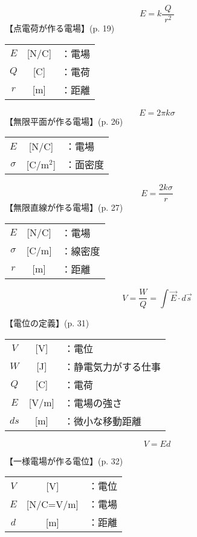 \documentclass[10pt]{jarticle}
\begin{document}
\newpage
\[
E = k \frac{Q}{\; r^2 \;}
\]
\vskip3mm
【点電荷が作る電場】{\footnotesize (p. 19)}

\begin{tabular}{ccl}
$E$	&[N/C]	&：電場 \\
$Q$	&[C]	&：電荷 \\
$r$	&[m]	&：距離
\end{tabular}





\newpage
\[
E = 2 \pi k \sigma
\]
\vskip3mm
【無限平面が作る電場】{\footnotesize (p. 26)}

\begin{tabular}{ccl}
$E$	&[N/C]	&：電場 \\
$\sigma$	&[C/m$^2$]	&：面密度
\end{tabular}




\newpage
\[
E = \frac{2k \sigma}{r}
\]
\vskip3mm
【無限直線が作る電場】{\footnotesize (p. 27)}

\begin{tabular}{ccl}
$E$	&[N/C]	&：電場 \\
$\sigma$	&[C/m]	&：線密度\\
$r$	&[m]	&：距離
\end{tabular}




\newpage
\[
V = \frac{W}{Q} = \int \vec{E} \cdot d\vec{s}
\]


\vskip3mm
【電位の定義】{\footnotesize (p. 31)}

\begin{tabular}{ccl}
$V$	&[V]	&：電位 \\
$W$	&[J]	&：{\small 静電気力がする仕事} \\
$Q$	&[C]	&：電荷\\
$E$	&[V/m]	&：電場の強さ\\
$ds$	&[m]	&：微小な移動距離\\
\end{tabular}




\newpage
\[
V = E d
\]


\vskip3mm
【一様電場が作る電位】{\footnotesize (p. 32)}

\begin{tabular}{ccl}
$V$	&[V]	&：電位 \\
$E$	&[N/C=V/m]	&：電場 \\
$d$	&[m]	&：距離
\end{tabular}
\end{document}
